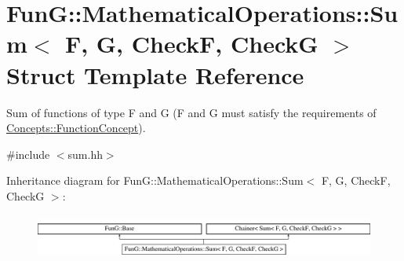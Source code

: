 \hypertarget{structFunG_1_1MathematicalOperations_1_1Sum}{\section{Fun\-G\-:\-:Mathematical\-Operations\-:\-:Sum$<$ F, G, Check\-F, Check\-G $>$ Struct Template Reference}
\label{structFunG_1_1MathematicalOperations_1_1Sum}
}


Sum of functions of type F and G (F and G must satisfy the requirements of \hyperlink{structFunG_1_1Concepts_1_1FunctionConcept}{Concepts\-::\-Function\-Concept}).  




{\ttfamily \#include $<$sum.\-hh$>$}

Inheritance diagram for Fun\-G\-:\-:Mathematical\-Operations\-:\-:Sum$<$ F, G, Check\-F, Check\-G $>$\-:\begin{figure}[H]
\begin{center}
\leavevmode
\includegraphics[height=1.473684cm]{structFunG_1_1MathematicalOperations_1_1Sum}
\end{center}
\end{figure}
